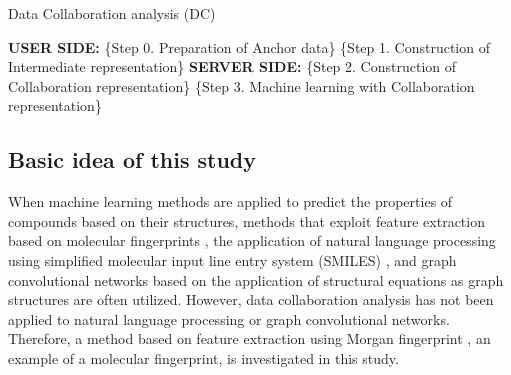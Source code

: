 \documentclass{article}
\begin{document}
\begin{algorithm}
  \caption{Data Collaboration analysis (DC) \cite{imakura2020data}}
  \label{alg:hoge}
  \begin{algorithmic}[1]
    \State \textbf{USER SIDE:}
    \State \{Step 0. Preparation of Anchor data\}
    \State \{Step 1. Construction of Intermediate representation\}
\EndFor
    \State \textbf{SERVER SIDE:}
    \State \{Step 2. Construction of Collaboration representation\}
\EndFor
    \State \{Step 3. Machine learning with Collaboration representation\}
  \end{algorithmic}
\end{algorithm}

\subsection{Basic idea of this study}
\label{sec:sample1}
When machine learning methods are applied to predict the properties of compounds based on their structures, methods that exploit feature extraction based on molecular fingerprints \cite{myint2012molecular}, the application of natural language processing using simplified molecular input line entry system (SMILES) \cite{karpov2020transformer}, and graph convolutional networks based on the application of structural equations as graph structures \cite{hung2021qsar} are often utilized. However, data collaboration analysis has not been applied to natural language processing or graph convolutional networks. Therefore, a method based on feature extraction using Morgan fingerprint \cite{rogers2010extended}, an example of a molecular fingerprint, is investigated in this study.
\end{document}
